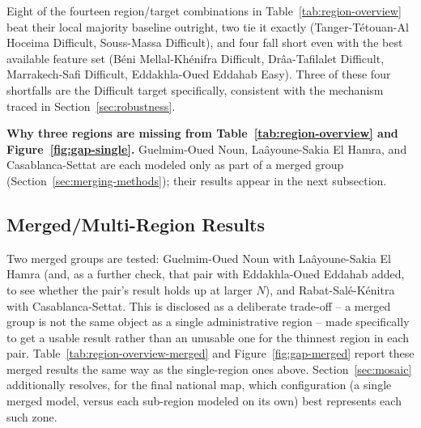\documentclass[11pt,a4paper]{article}
\begin{document}
Eight of the fourteen region/target combinations in Table~\ref{tab:region-overview} beat their local majority baseline outright, two tie it exactly (Tanger-Tétouan-Al Hoceima Difficult, Souss-Massa Difficult), and four fall short even with the best available feature set (Béni Mellal-Khénifra Difficult, Drâa-Tafilalet Difficult, Marrakech-Safi Difficult, Eddakhla-Oued Eddahab Easy). Three of these four shortfalls are the Difficult target specifically, consistent with the mechanism traced in Section~\ref{sec:robustness}.

\textbf{Why three regions are missing from Table~\ref{tab:region-overview} and Figure~\ref{fig:gap-single}.} Guelmim-Oued Noun, Laâyoune-Sakia El Hamra, and Casablanca-Settat are each modeled only as part of a merged group (Section~\ref{sec:merging-methods}); their results appear in the next subsection.

\subsection{Merged/Multi-Region Results}
\label{sec:merging}
Two merged groups are tested: Guelmim-Oued Noun with Laâyoune-Sakia El Hamra (and, as a further check, that pair with Eddakhla-Oued Eddahab added, to see whether the pair's result holds up at larger $N$), and Rabat-Salé-Kénitra with Casablanca-Settat. This is disclosed as a deliberate trade-off -- a merged group is not the same object as a single administrative region -- made specifically to get a usable result rather than an unusable one for the thinnest region in each pair. Table~\ref{tab:region-overview-merged} and Figure~\ref{fig:gap-merged} report these merged results the same way as the single-region ones above. Section~\ref{sec:mosaic} additionally resolves, for the final national map, which configuration (a single merged model, versus each sub-region modeled on its own) best represents each such zone.
\end{document}
